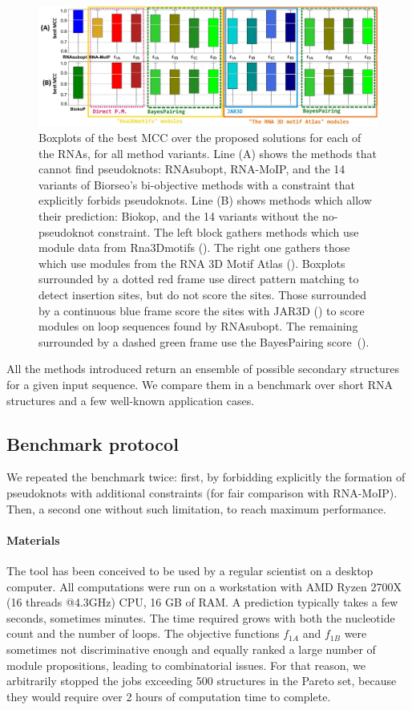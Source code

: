 \documentclass{bioinfo}
\begin{document}
\begin{figure}[!tbp]
   \includegraphics[width=\textwidth]{fig/Benchmark.jpg}
   \caption{Boxplots of the best MCC over the proposed solutions for each of the RNAs, for all method variants. Line (A) shows the methods that cannot find pseudoknots: RNAsubopt, RNA-MoIP, and the 14 variants of Biorseo's bi-objective methods with a constraint that explicitly forbids pseudoknots. Line (B) shows methods which allow their prediction: Biokop, and the 14 variants without the no-pseudoknot constraint. The left block gathers methods which use module data from Rna3Dmotifs (\citealp{djelloul_automated_2008}). The right one gathers those which use modules from the RNA 3D Motif Atlas (\citealp{petrov_automated_2013}). Boxplots surrounded by a dotted red frame use direct pattern matching to detect insertion sites, but do not score the sites. Those surrounded by a continuous blue frame score the sites with JAR3D (\citealp{zirbel_identifying_2015}) to score modules on loop sequences found by RNAsubopt. The remaining surrounded by a dashed green frame use the BayesPairing score~(\citealp{sarrazin2019automated}).}
   \label{fig:upgrades}
\end{figure}

All the methods introduced return an ensemble of possible secondary structures for a given input sequence. We compare them in a benchmark over short RNA structures and a few well-known application cases. 

\subsection{Benchmark protocol} \label{sec:bench}
We repeated the benchmark twice: first, by forbidding explicitly the formation of pseudoknots with additional constraints (for fair comparison with RNA-MoIP). Then, a second one without such limitation, to reach maximum performance.

\paragraph{Materials}
The tool has been conceived to be used by a regular scientist on a desktop computer. All computations were run on a workstation with AMD Ryzen 2700X (16 threads @4.3GHz) CPU, 16 GB of RAM. A prediction typically takes a few seconds, sometimes minutes. The time required grows with both the nucleotide count and the number of loops. The objective functions $f_{1A}$ and $f_{1B}$ were sometimes not discriminative enough and equally ranked a large number of module propositions, leading to combinatorial issues. For that reason, we arbitrarily stopped the jobs exceeding 500 structures in the Pareto set, because they would require over 2 hours of computation time to complete. 
\end{document}
